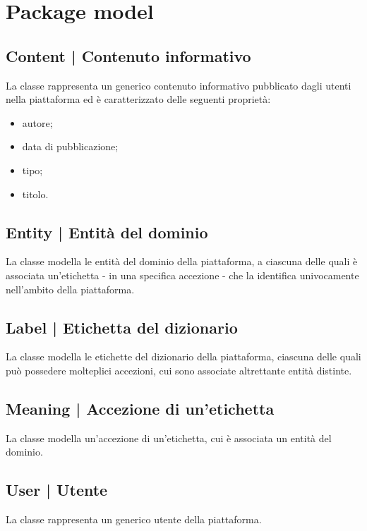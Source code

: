 \documentclass[10pt,a4paper,headinclude,footinclude,hidelinks]{scrreprt} %
\begin{document}
	\section{Package model}
	\label{sec:stage:design:sistema:model}

	\subsection[Content]{Content | Contenuto informativo}
	\label{sec:stage:design:sistema:model:content}
	La classe rappresenta un generico contenuto informativo pubblicato dagli utenti nella piattaforma ed è caratterizzato delle seguenti proprietà:
	\begin{itemize}
	\item autore;
	\item data di pubblicazione;
	\item tipo;
	\item titolo.
	\end{itemize}

	\subsection[Entity]{Entity | Entità del dominio}
	\label{sec:stage:design:sistema:model:entity}
	La classe modella le entità del dominio della piattaforma, a ciascuna delle quali è associata un'etichetta - in una specifica accezione - che la identifica univocamente nell'ambito della piattaforma. 

	\subsection[Label]{Label | Etichetta del dizionario}
	\label{sec:stage:design:sistema:model.search:label}
	La classe modella le etichette del dizionario della piattaforma, ciascuna delle quali può possedere molteplici accezioni, cui sono associate altrettante entità distinte.  

	\subsection[Meaning]{Meaning | Accezione di un'etichetta}
	\label{sec:stage:design:sistema:model:meaning}
	La classe modella un'accezione di un'etichetta, cui è associata un entità del dominio.

	\subsection[User]{User | Utente}
	\label{sec:stage:design:sistema:model:user}
	La classe rappresenta un generico utente della piattaforma.
\end{document}
